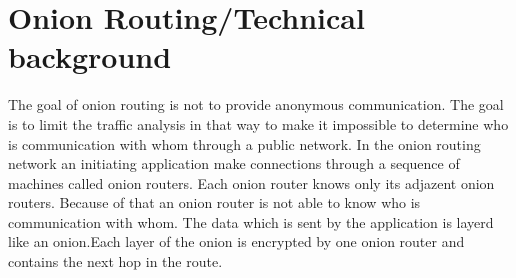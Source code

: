 \section{Onion Routing/Technical background}
The goal of onion routing is not to provide anonymous communication. The goal is to limit the traffic analysis in that way to make it impossible to determine who is communication with whom through a public network. In the onion routing network an initiating application make connections through a sequence of machines called onion routers. Each onion router knows only its adjazent onion routers. Because of that an onion router is not able to know who is communication with whom. The data which is sent by the application is layerd like an onion.Each layer of the onion is encrypted by one onion router and contains the next hop in the route. \cite{reed1998anonymous}